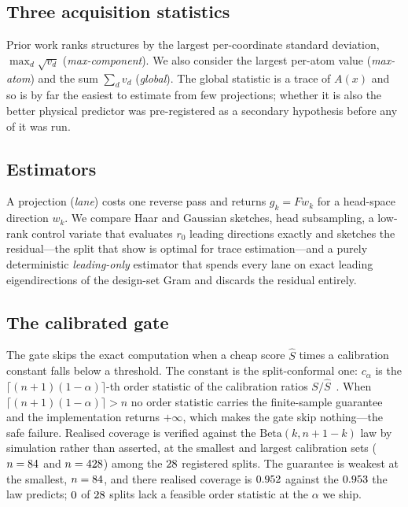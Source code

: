 \subsection{Three acquisition statistics}
Prior work ranks structures by the largest per-coordinate standard deviation,
$\max_d\sqrt{v_d}$ (\emph{max-component}). We also consider the largest per-atom
value (\emph{max-atom}) and the sum $\sum_d v_d$ (\emph{global}). The global
statistic is a trace of $A(x)$ and so is by far the easiest to estimate from few
projections; whether it is also the better physical predictor was pre-registered
as a secondary hypothesis before any of it was run.

\subsection{Estimators}
A projection (\emph{lane}) costs one reverse pass and returns $g_k=F w_k$ for a
head-space direction $w_k$. We compare Haar and Gaussian sketches, head
subsampling, a low-rank control variate that evaluates $r_0$ leading directions
exactly and sketches the residual---the split that
\citet{meyer2021hutchpp} show is optimal for trace estimation---and a purely deterministic
\emph{leading-only} estimator that spends every lane on exact leading
eigendirections of the design-set Gram and discards the residual entirely.

\subsection{The calibrated gate}
The gate skips the exact computation when a cheap score $\hat{S}$ times a
calibration constant falls below a threshold. The constant is the
split-conformal one: $c_\alpha$ is the
$\lceil (n+1)(1-\alpha)\rceil$-th order statistic of the calibration ratios
$S/\hat{S}$~\citep{vovk2005algorithmic,lei2018distribution}. When
$\lceil (n+1)(1-\alpha)\rceil > n$ no order statistic carries the finite-sample
guarantee and the implementation returns $+\infty$, which makes the gate skip
nothing---the safe failure. Realised coverage is verified against the
$\mathrm{Beta}(k,n{+}1{-}k)$ law by simulation rather than asserted, at the
smallest and largest calibration sets ($n=84$ and $n=428$) among
the $28$ registered splits.
The guarantee is weakest at the smallest, $n=84$, and there realised
coverage is $0.952$ against the $0.953$ the law predicts;
$0$ of $28$ splits lack a feasible order statistic at
the $\alpha$ we ship.

